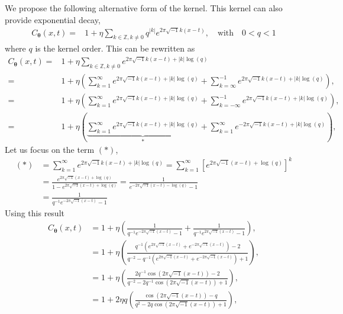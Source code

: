 \documentclass{iitthesis}          %
\newcommand{\bm}[1]{\boldsymbol{#1}}
\newcommand{\vtheta}{{\bm{\theta}}}
\def\abs#1{\ensuremath{\left \lvert #1 \right \rvert}}
\begin{document}
\label{sec:exp_decay_kernel}
We propose the following alternative form of the kernel. This kernel can also provide exponential decay,
\begin{align*}
C_\vtheta(x, t) = & 1 + \eta \sum_{k \in \mathbb{Z}, k \neq 0 } q^{\abs{k}}  
e^{ 2 \pi\sqrt{-1} k (x-t)}, \quad \text{with} \quad 0 < q < 1
\end{align*}
where $q$ is the kernel order. This can be rewritten as
\begin{align*}
C_\vtheta(x, t) = & 1 + \eta \sum_{k \in \mathbb{Z}, k \neq 0 } 
e^{ 2 \pi\sqrt{-1} k (x-t) + \abs{k} \log(q)}
\\
=& 1 + \eta 
\left(
\sum_{k=1}^\infty e^{ 2 \pi\sqrt{-1} k (x-t) + \abs{k} \log(q)} 
+
\sum_{k=\infty}^{-1} e^{ 2 \pi\sqrt{-1} k (x-t) + \abs{k} \log(q)}
\right), 
\\
=& 1 + \eta 
\left(
\sum_{k=1}^\infty e^{ 2 \pi\sqrt{-1} k (x-t) + \abs{k} \log(q)} 
+
\sum_{k=-\infty}^{-1} e^{ 2 \pi\sqrt{-1} k (x-t) + \abs{k} \log(q)}
\right), 
\\
=& 1 + \eta 
\left(
\underbrace{
	\sum_{k=1}^\infty e^{ 2 \pi\sqrt{-1} k (x-t) + \abs{k} \log(q)} }_{*}
+
\sum_{k=1}^{\infty} e^{ -2 \pi\sqrt{-1} k (x-t) + \abs{k} \log(q)}
\right), 
\end{align*}
Let us focus on the term $(*)$,
\begin{align*}
(*) & = \sum_{k=1}^\infty e^{ 2 \pi\sqrt{-1} k (x-t) + \abs{k} \log(q)} =
\sum_{k=1}^\infty \left[e^{ 2 \pi\sqrt{-1} (x-t) +  \log(q)} \right]^k
\\
& = \frac{e^{ 2 \pi\sqrt{-1} (x-t) +  \log(q)}}{1- e^{ 2 \pi\sqrt{-1} (x-t) +  \log(q)}}
= \frac{1}{ e^{- 2 \pi\sqrt{-1} (x-t) -  \log(q)} -1 }
\\
& =\frac{1}{ q^{-1} e^{- 2 \pi\sqrt{-1} (x-t)} -1 }
\end{align*}
Using this result
\begin{align*}
C_\vtheta(x, t) &= 
1 + \eta 
\left(
\frac{1}{ q^{-1} e^{- 2 \pi\sqrt{-1} (x-t)} -1 }
+
\frac{1}{ q^{-1} e^{ 2 \pi\sqrt{-1} (x-t)} -1 }
\right),
\\
&= 
1 + \eta 
\left(
\frac{q^{-1} \left(e^{2 \pi\sqrt{-1} (x-t) }+ e^{ -2 \pi\sqrt{-1} (x-t)}\right) -2 }
{q^{-2} - q^{-1} \left(e^{ 2 \pi\sqrt{-1} (x-t)} + e^{ -2 \pi\sqrt{-1} (x-t)}\right) + 1 }
\right),
\\
&= 
1 + \eta 
\left(
\frac{2 q^{-1} \cos({2 \pi\sqrt{-1} (x-t) }) -2 }
{q^{-2} - 2 q^{-1} \cos({ 2 \pi\sqrt{-1} (x-t)})  + 1 }
\right),
\\
&= 
1 + 2 \eta q
\left(
\frac{ \cos({2 \pi\sqrt{-1} (x-t) }) - q }
{q^{2} - 2 q \cos({ 2 \pi\sqrt{-1} (x-t)})  + 1 }
\right),
\end{align*}
\end{document}
